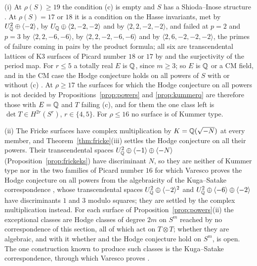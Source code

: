 \begin{remark}\label{rem:detfrontier}
(i) At $\rho(S)\ge19$ the condition (c) is empty and $S$ has a Shioda--Inose structure \cite{Mor84}. At $\rho(S)=17$ or $18$ it is a condition on the Hasse invariants, met by $U_{\mathbb{Q}}^{2}\oplus\langle-2\rangle$, by $U_{\mathbb{Q}}\oplus\langle2,-2,-2\rangle$ and by $\langle2,2,-2,-2\rangle$, and failed at $p=2$ and $p=3$ by $\langle2,2,-6,-6\rangle$, by $\langle2,2,-2,-6,-6\rangle$ and by $\langle2,6,-2,-2,-2\rangle$, the primes of failure coming in pairs by the product formula; all six are transcendental lattices of K3 surfaces of Picard number $18$ or $17$ by \cite{Nik80} and the surjectivity of the period map. For $r\le5$ a totally real $E$ is $\mathbb{Q}$, since $m\ge3$; so $E$ is $\mathbb{Q}$ or a CM field, and in the CM case the Hodge conjecture holds on all powers of $S$ with or without (c) \cite{RM08}. At $\rho\ge17$ the surfaces for which the Hodge conjecture on all powers is not decided by Propositions~\ref{prop:powers} and \ref{prop:kummerq} are therefore those with $E=\mathbb{Q}$ and $T$ failing (c), and for them the one class left is $\det T\in H^{2r}(S^{r})$, $r\in\{4,5\}$. For $\rho\le16$ no surface is of Kummer type.

(ii) The Fricke surfaces have complex multiplication by $K=\mathbb{Q}(\sqrt{-N})$ at every member, and Theorem~\ref{thm:fricke}(iii) settles the Hodge conjecture on all their powers. Their transcendental spaces $U_{\mathbb{Q}}^{2}\oplus\langle-1\rangle\oplus\langle-N\rangle$ (Proposition~\ref{prop:frickeks}) have discriminant $N$, so they are neither of Kummer type nor in the two families of Picard number $16$ for which Varesco proves the Hodge conjecture on all powers from the algebraicity of the Kuga--Satake correspondence \cite[Thm.~4.3, Exs.~4.4, 4.5]{Var25}, whose transcendental spaces $U_{\mathbb{Q}}^{2}\oplus\langle-2\rangle^{2}$ and $U_{\mathbb{Q}}^{2}\oplus\langle-6\rangle\oplus\langle-2\rangle$ have discriminants $1$ and $3$ modulo squares; they are settled by the complex multiplication instead. For each surface of Proposition~\ref{prop:powers}(ii) the exceptional classes are Hodge classes of degree $2m$ on $S^{m}$ reached by no correspondence of this section, all of which act on $T\otimes T$; whether they are algebraic, and with it whether \Fiii{} and the Hodge conjecture hold on $S^{m}$, is open. The one construction known to produce such classes is the Kuga--Satake correspondence, through which Varesco proves \cite[Thm.~4.3]{Var25}.
\end{remark}

